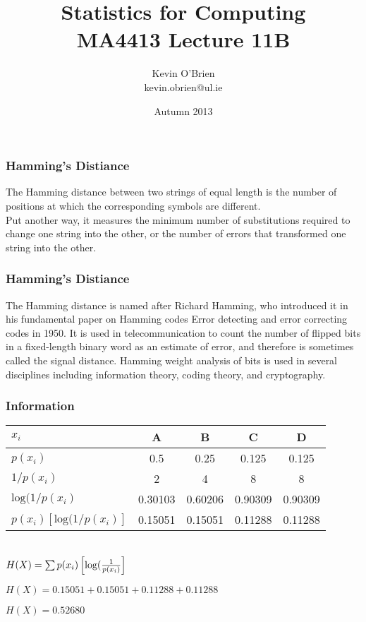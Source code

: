 \documentclass[a4]{beamer}
\title[MA4413]{Statistics for Computing \\ {\normalsize MA4413 Lecture 11B}}
\author[Kevin O'Brien]{Kevin O'Brien \\ {\scriptsize kevin.obrien@ul.ie}}
\date{Autumn 2013}
\institute[Maths \& Stats]{Dept. of Mathematics \& Statistics, \\ University \textit{of} Limerick}
\begin{document}
\begin{frame}
\frametitle{Hamming's Distiance}
\Large
The Hamming distance between two strings of equal length is the number of positions at which the corresponding symbols are different.\\ Put another way, it measures the minimum number of substitutions required to change one string into the other, or the number of errors that transformed one string into the other.
\end{frame} 
\begin{frame}
\frametitle{Hamming's Distiance}
The Hamming distance is named after Richard Hamming, who introduced it in his fundamental paper on Hamming codes Error detecting and error correcting codes in 1950. It is used in telecommunication to count the number of flipped bits in a fixed-length binary word as an estimate of error, and therefore is sometimes called the signal distance. Hamming weight analysis of bits is used in several disciplines including information theory, coding theory, and cryptography.
\end{frame}


\begin{frame}
\frametitle{Information}
\begin{tabular}{|l||c|c|c|c|} \hline
$x_i$ & A & B & C & D \\ \hline \hline
$p(x_i)$ &0.5&0.25&0.125 &0.125 \\ \hline
$1/ p(x_i)$ &2&4&8 &8 \\ \hline
$\mbox{log}(1/ p(x_i)$  &0.30103	 &0.60206 	  &0.90309&	0.90309 \\ \hline
$p(x_i) [\mbox{log}(1/ p(x_i)]$ & 0.15051 &	0.15051&	0.11288 &	0.11288 \\ \hline
\end{tabular}
\\  \bigskip
\large
$H(X) = \sum p(x_i) \left[\mbox{log}({1 \over p(x_i)}\right] $  \bigskip 

$H(X) = 0.15051 +	0.15051+	0.11288 +	0.11288 $ \bigskip

$H(X) =  0.52680 $


\end{frame}
\end{document}
